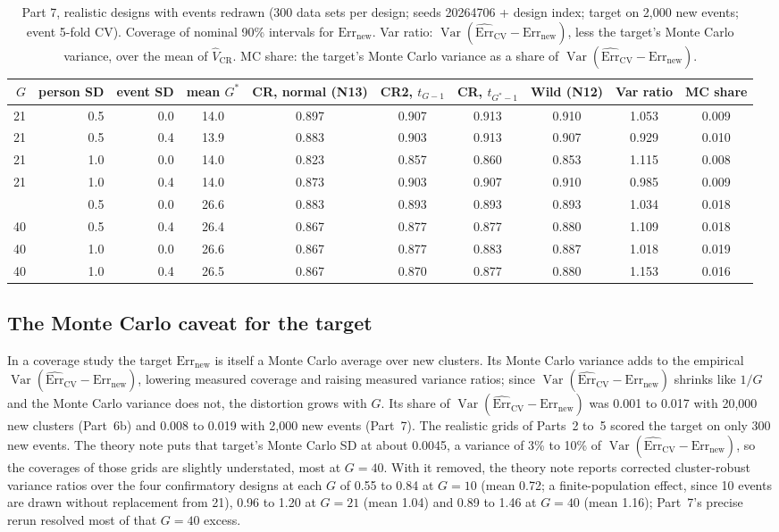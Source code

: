 \documentclass[11pt]{amsart}
\theoremstyle{plain}
\theoremstyle{definition}
\theoremstyle{remark}
\newcommand{\Var}{\operatorname{Var}}
\newcommand{\CV}{\widehat{\mathrm{Err}}_{\mathrm{CV}}}
\newcommand{\Errnew}{\mathrm{Err}_{\mathrm{new}}}
\newcommand{\VCR}{\hat V_{\mathrm{CR}}}
\begin{document}
\begin{table}[tbp]
\centering\footnotesize
\caption{Part 7, realistic designs with events redrawn (300 data sets per design; seeds 20264706 + design index; target on 2,000 new events; event 5-fold CV). Coverage of nominal 90\% intervals for $\Errnew$. Var ratio: $\Var(\CV-\Errnew)$, less the target's Monte Carlo variance, over the mean of $\VCR$. MC share: the target's Monte Carlo variance as a share of $\Var(\CV-\Errnew)$.}\label{tab:sizes}
\begin{tabular}{@{}r r r c c c c c c c@{}}
\toprule
$G$ & person SD & event SD & mean $G^*$ & CR, normal (N13) & CR2, $t_{G-1}$ & CR, $t_{G^*-1}$ & Wild (N12) & Var ratio & MC share\\
\midrule
21 & 0.5 & 0.0 & 14.0 & 0.897 & 0.907 & 0.913 & 0.910 & 1.053 & 0.009 \\
21 & 0.5 & 0.4 & 13.9 & 0.883 & 0.903 & 0.913 & 0.907 & 0.929 & 0.010 \\
21 & 1.0 & 0.0 & 14.0 & 0.823 & 0.857 & 0.860 & 0.853 & 1.115 & 0.008 \\
21 & 1.0 & 0.4 & 14.0 & 0.873 & 0.903 & 0.907 & 0.910 & 0.985 & 0.009 \\
\addlinespace
40 & 0.5 & 0.0 & 26.6 & 0.883 & 0.893 & 0.893 & 0.893 & 1.034 & 0.018 \\
40 & 0.5 & 0.4 & 26.4 & 0.867 & 0.877 & 0.877 & 0.880 & 1.109 & 0.018 \\
40 & 1.0 & 0.0 & 26.6 & 0.867 & 0.877 & 0.883 & 0.887 & 1.018 & 0.019 \\
40 & 1.0 & 0.4 & 26.5 & 0.867 & 0.870 & 0.877 & 0.880 & 1.153 & 0.016 \\
\bottomrule
\end{tabular}
\end{table}

\subsection{The Monte Carlo caveat for the target}\label{sec:mc}

In a coverage study the target $\Errnew$ is itself a Monte Carlo average over new clusters. Its Monte Carlo variance adds to the empirical $\Var(\CV-\Errnew)$, lowering measured coverage and raising measured variance ratios; since $\Var(\CV-\Errnew)$ shrinks like $1/G$ and the Monte Carlo variance does not, the distortion grows with $G$. Its share of $\Var(\CV-\Errnew)$ was 0.001 to 0.017 with 20,000 new clusters (Part~6b) and 0.008 to 0.019 with 2,000 new events (Part~7). The realistic grids of Parts~2 to~5 scored the target on only 300 new events. The theory note puts that target's Monte Carlo SD at about 0.0045, a variance of 3\% to 10\% of $\Var(\CV-\Errnew)$, so the coverages of those grids are slightly understated, most at $G=40$. With it removed, the theory note reports corrected cluster-robust variance ratios over the four confirmatory designs at each $G$ of 0.55 to 0.84 at $G=10$ (mean 0.72; a finite-population effect, since 10 events are drawn without replacement from 21), 0.96 to 1.20 at $G=21$ (mean 1.04) and 0.89 to 1.46 at $G=40$ (mean 1.16); Part~7's precise rerun resolved most of that $G=40$ excess.
\end{document}
